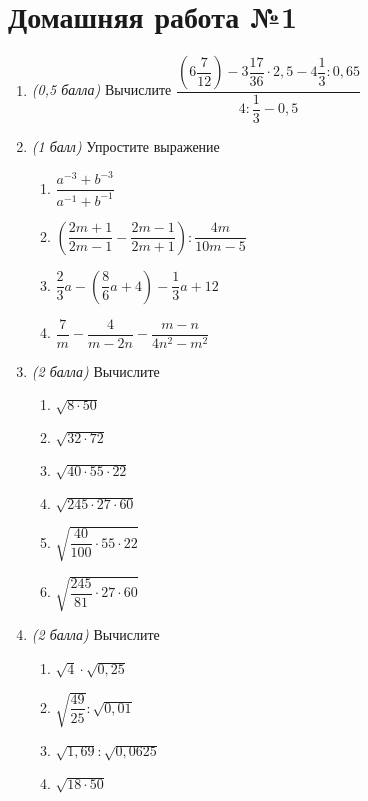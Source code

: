 \documentclass[12pt, a4paper]{article}
\begin{document}
	
	
	\section*{Домашняя работа №1}
	\begin{enumerate}
		\item \textit{(0,5 балла)} Вычислите $\dfrac{\left( 6 \dfrac{7}{12}\right)-3\dfrac{17}{36} \cdot 2,5 - 4\dfrac{1}{3}:0,65}{4:\dfrac{1}{3}-0,5}$
		\item \textit{(1 балл)} Упростите выражение
		\begin{multicols}{2}
			\begin{enumerate}[label=\asbuk*)]
				\item $\dfrac{a^{-3}+b^{-3}}{a^{-1}+b^{-1}}$
				\item $\left(\dfrac{2m+1}{2m-1}-\dfrac{2m-1}{2m+1}\right):\dfrac{4m}{10m-5}$
				\item $\dfrac{2}{3}a-(\dfrac{8}{6}a+4)-\dfrac{1}{3}a+12$
				\item $\dfrac{7}{m}-\dfrac{4}{m-2n}-\dfrac{m-n}{4n^2-m^2}$
			\end{enumerate}
		\end{multicols}
		\item \textit{(2 балла)} Вычислите
			\begin{multicols}{2}
			\begin{enumerate}[label=\asbuk*)]
				\item $\sqrt{8 \cdot 50}$
				\item $\sqrt{32 \cdot 72}$
				\item $\sqrt{40 \cdot 55 \cdot 22}$
				\item $\sqrt{245 \cdot 27 \cdot 60}$
				\item $\sqrt{\dfrac{40}{100} \cdot 55 \cdot 22}$
				\item $\sqrt{\dfrac{245}{81} \cdot 27 \cdot 60}$
			\end{enumerate}
		\end{multicols}
		\item \textit{(2 балла)} Вычислите
		\begin{multicols}{2}
			\begin{enumerate}[label=\asbuk*)]
				\item $\sqrt {4} \cdot \sqrt{0,25}$
				\item $\sqrt{\dfrac{49}{25}} : \sqrt{0,01}$
				\item $\sqrt{1,69} : \sqrt{0,0625}$
				\item $\sqrt{18 \cdot 50}$

\end{enumerate}
\end{multicols}
\end{enumerate}
\end{document}
